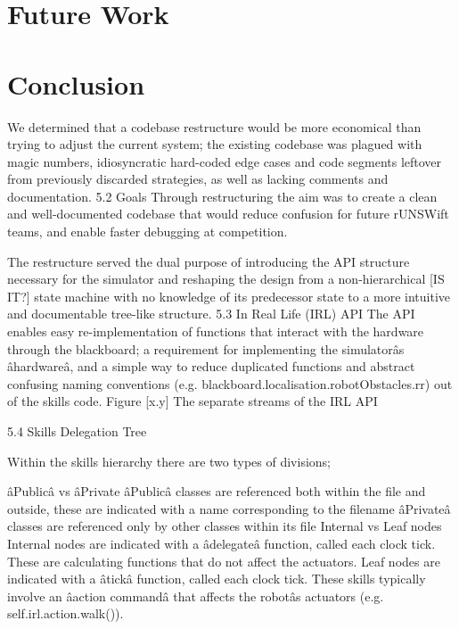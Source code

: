 \section{Future Work}


\section{Conclusion}





We determined that a codebase restructure would be more economical than trying to adjust the current system; the existing codebase was plagued with magic numbers, idiosyncratic hard-coded edge cases and code segments leftover from previously discarded strategies, as well as lacking comments and documentation.
5.2 Goals
Through restructuring the aim was to create a clean and well-documented codebase that would reduce confusion for future rUNSWift teams, and enable faster debugging at competition.

The restructure served the dual purpose of introducing the API structure necessary for the simulator and reshaping the design from a non-hierarchical [IS IT?] state machine with no knowledge of its predecessor state to a more intuitive and documentable tree-like structure.
5.3 In Real Life (IRL) API
The API enables easy re-implementation of functions that interact with the hardware through the blackboard; a requirement for implementing the simulatorâs âhardwareâ, and a simple way to reduce duplicated functions and abstract confusing naming conventions (e.g. blackboard.localisation.robotObstacles.rr) out of the skills code.
Figure [x.y] The separate streams of the IRL API

5.4 Skills Delegation Tree

Within the skills hierarchy there are two types of divisions; 

âPublicâ vs âPrivate
âPublicâ classes are referenced both within the file and outside, these are indicated with a name corresponding to the filename
âPrivateâ classes are referenced only by other classes within its file
Internal vs Leaf nodes
Internal nodes are indicated with a âdelegateâ function, called each clock tick. These are calculating functions that do not affect the actuators.
Leaf nodes are indicated with a âtickâ function, called each clock tick. These skills typically involve an âaction commandâ that affects the robotâs actuators (e.g. self.irl.action.walk()).

